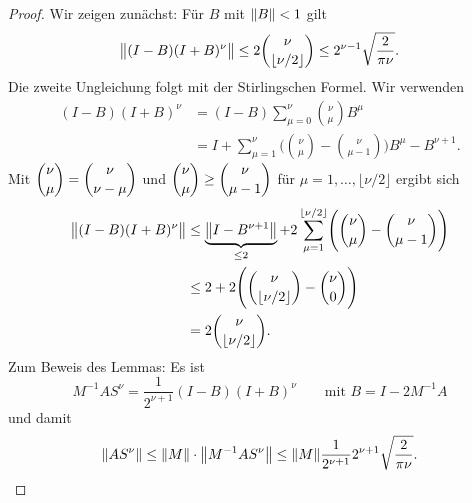 \begin{proof}
  Wir zeigen zun\"achst: F\"ur $B$ mit $\norm{B}<1$ gilt
  \begin{equation*}
    \norm[big]{ (I-B) (I+B)^\nu }
    \leq
    2 \binom{\nu}{\lfloor\nu/2\rfloor}
    \leq
    2^{\nu-1}\sqrt{\frac{2}{\pi\nu}}.
  \end{equation*}
  Die zweite Ungleichung folgt mit der Stirlingschen Formel.
  Wir verwenden
  \begin{align*}
    (I-B) (I+B)^\nu
    &=
    (I-B)\sum_{\mu=0}^{\nu}\binom{\nu}{\mu}B^\mu
    \\
    &=
    I+\sum_{\mu=1}^{\nu}
    \Biggl(\binom{\nu}{\mu}-\binom{\nu}{\mu-1}\Biggr)
    B^\mu-B^{\nu+1}.
  \end{align*}
  Mit
  $\dbinom{\nu}{\mu}=\dbinom{\nu}{\nu-\mu}$
  und
  $\dbinom{\nu}{\mu}\geq\dbinom{\nu}{\mu-1}$
  f\"ur $\mu=1,\dots,\lfloor\nu/2\rfloor$ ergibt sich
  \begin{align*}
    \norm[big]{ (I-B)(I+B)^\nu }
    &\leq
    \underbrace{\norm[big]{ I-B^{\nu+1} }}_{\leq2}
    +
    2\sum_{\mu=1}^{\lfloor\nu/2\rfloor}
    \Biggl(\binom{\nu}{\mu}-\binom{\nu}{\mu-1}\Biggr)
    \\
    &\leq
    2+2\Biggl(\binom{\nu}{\lfloor\nu/2\rfloor}-\binom{\nu}{0}\Biggr)
    \\
    &=
    2\binom{\nu}{\lfloor\nu/2\rfloor}.
  \end{align*}
  Zum Beweis des Lemmas: Es ist
  \begin{equation*}
    M^{-1}AS^\nu
    =
    \frac{1}{2^{\nu+1}}(I-B)(I+B)^\nu
    \qquad
    \text{mit }
    B=I-2M^{-1}A
  \end{equation*}
  und damit
  \begin{equation*}
    \norm{AS^\nu}
    \leq
    \norm{M}\cdot\norm{M^{-1}AS^\nu}
    \leq
    \norm{M}\frac{1}{2^{\nu+1}}2^{\nu+1}\sqrt{\frac{2}{\pi\nu}}.
  \end{equation*}
\end{proof}

